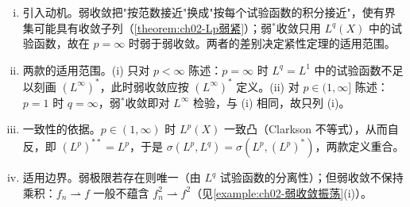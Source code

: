\documentclass[../../main.tex]{subfiles}%
\begin{document}
\begin{remark}\label{remark:ch02-弱弱星收敛}
\begin{enumerate}[(i)]
\item 引入动机。弱收敛把"按范数接近"换成"按每个试验函数的积分接近"，使有界集可能具有收敛子列（\cref{theorem:ch02-Lp弱紧}）；弱$^*$收敛只用 $L^q(X)$ 中的试验函数，故在 $p=\infty$ 时弱于弱收敛。两者的差别决定紧性定理的适用范围。
\item 两款的适用范围。(i) 只对 $p<\infty$ 陈述：$p=\infty$ 时 $L^q=L^1$ 中的试验函数不足以刻画 $(L^\infty)^*$，此时弱收敛应按 $(L^\infty)^*$ 定义。(ii) 对 $p\in(1,\infty]$ 陈述：$p=1$ 时 $q=\infty$，弱$^*$收敛即对 $L^\infty$ 检验，与 (i) 相同，故只列 (i)。
\item 一致性的依据。$p\in(1,\infty)$ 时 $L^p(X)$ 一致凸（Clarkson 不等式），从而自反，即 $(L^p)^{**}=L^p$，于是 $\sigma(L^p,L^q)=\sigma(L^p,(L^p)^*)$，两款定义重合。
\item 适用边界。弱极限若存在则唯一（由 $L^q$ 试验函数的分离性）；但弱收敛不保持乘积：$f_n\rightharpoonup f$ 一般不蕴含 $f_n^2\rightharpoonup f^2$（见\cref{example:ch02-弱收敛振荡}(i)）。
\end{enumerate}
\end{remark}
\end{document}
